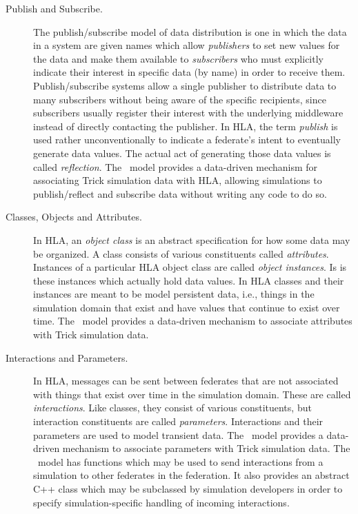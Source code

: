 \begin{description}
\item[Publish and Subscribe.]
The publish/subscribe model of data distribution is one in which
the data in a system are given names which allow {\em publishers} to
set new values for the data and make them available to {\em subscribers}
who must explicitly indicate their interest in specific data (by name)
in order to receive them.
Publish/subscribe systems allow a single publisher to distribute
data to many subscribers without being aware of the specific recipients, 
since subscribers usually register their interest with the underlying 
middleware instead of directly contacting the publisher.
In HLA, the term {\em publish} is used rather unconventionally to indicate
a federate's intent to eventually generate data values.  
The actual act of generating those data values is called {\em reflection}.
The \TrickHLA\ model provides a data-driven mechanism for associating
Trick simulation data with HLA,
allowing simulations to publish/reflect and subscribe data without writing
any code to do so.

\item[Classes, Objects and Attributes.]
In HLA, an {\em object class} is an abstract specification for how some data may
be organized. 
A class consists of various constituents called {\em attributes}.
Instances of a particular HLA object class are called {\em object instances}.
Is is these instances which actually hold data values.
In HLA classes and their instances are meant to be model persistent data,
i.e., things in the simulation domain that exist and have values that continue
to exist over time.
The \TrickHLA\ model provides a data-driven mechanism to associate attributes 
with Trick simulation data.

\item[Interactions and Parameters.]
In HLA, messages can be sent between federates that are not associated with things
that exist over time in the simulation domain.
These are called {\em interactions}.
Like classes, they consist of various constituents, but interaction constituents
are called {\em parameters}.
Interactions and their parameters are used to model transient data.
The \TrickHLA\ model provides a data-driven mechanism to associate parameters 
with Trick simulation data.
The \TrickHLA\ model has functions which may be used to send interactions from
a simulation to other federates in the federation.
It also provides an abstract C++ class which may be subclassed by simulation
developers in order to specify simulation-specific handling of incoming interactions.


\end{description}
